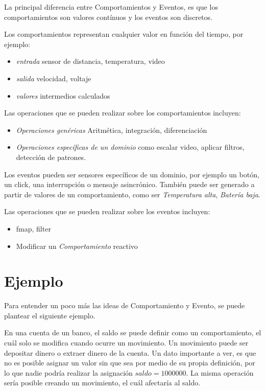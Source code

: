 La principal diferencia entre Comportamientos y Eventos, es que los
comportamientos son valores contínuos y los eventos son discretos.

Los comportamientos representan cualquier valor en función del tiempo,
por ejemplo:
\begin{itemize}
\item \textit{entrada} sensor de distancia, temperatura, video
\item \textit{salida} velocidad, voltaje
\item \textit{valores} intermedios calculados
\end{itemize}

Las operaciones que se pueden realizar sobre los comportamientos incluyen:
\begin{itemize}
\item \textit{Operaciones genéricas} Aritmética, integración, diferenciación
\item \textit{Operaciones específicas de un dominio} como escalar video, aplicar filtros, detección de patrones.
\end{itemize}

Los eventos pueden ser sensores específicos de un dominio, por ejemplo un
botón, un click, una interrupción o mensaje asincrónico.
También puede ser generado a partir de valores de un comportamiento,
como ser \emph{Temperatura alta}, \emph{Batería baja}.

Las operaciones que se pueden realizar sobre los eventos incluyen:
\begin{itemize}
\item fmap, filter
\item Modificar un \emph{Comportamiento} reactivo
\end{itemize}


\section{Ejemplo}

Para entender un poco más las ideas de Comportamiento y Evento, se puede
plantear el siguiente ejemplo.

  En una cuenta de un banco, el saldo se puede definir
como un comportamiento, el cuál solo se modifica cuando ocurre
un movimiento.
  Un movimiento puede ser depositar dinero o extraer
dinero de la cuenta.
  Un dato importante a ver, es que no es posible asignar un valor
sin que sea por medio de su propia definición, por lo que nadie
podría realizar la asignación $saldo = 1000000$.
  La misma operación sería posible creando un movimiento, el cuál
afectaría al saldo.

